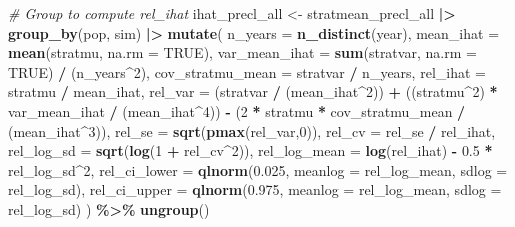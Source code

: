 \documentclass[
]{article}
\newenvironment{Shaded}{\begin{snugshade}}{\end{snugshade}}
\newcommand{\AttributeTok}[1]{\textcolor[rgb]{0.13,0.29,0.53}{#1}}
\newcommand{\CommentTok}[1]{\textcolor[rgb]{0.56,0.35,0.01}{\textit{#1}}}
\newcommand{\ConstantTok}[1]{\textcolor[rgb]{0.56,0.35,0.01}{#1}}
\newcommand{\DecValTok}[1]{\textcolor[rgb]{0.00,0.00,0.81}{#1}}
\newcommand{\FloatTok}[1]{\textcolor[rgb]{0.00,0.00,0.81}{#1}}
\newcommand{\FunctionTok}[1]{\textcolor[rgb]{0.13,0.29,0.53}{\textbf{#1}}}
\newcommand{\NormalTok}[1]{#1}
\newcommand{\OtherTok}[1]{\textcolor[rgb]{0.56,0.35,0.01}{#1}}
\newcommand{\SpecialCharTok}[1]{\textcolor[rgb]{0.81,0.36,0.00}{\textbf{#1}}}
\begin{document}
\begin{Shaded}
\begin{Highlighting}[]
\CommentTok{\# Group to compute rel\_ihat }
\NormalTok{ihat\_precl\_all }\OtherTok{\textless{}{-}}\NormalTok{ stratmean\_precl\_all }\SpecialCharTok{|\textgreater{}}
  \FunctionTok{group\_by}\NormalTok{(pop, sim) }\SpecialCharTok{|\textgreater{}}
  \FunctionTok{mutate}\NormalTok{(}
    \AttributeTok{n\_years =} \FunctionTok{n\_distinct}\NormalTok{(year), }
    \AttributeTok{mean\_ihat =} \FunctionTok{mean}\NormalTok{(stratmu, }\AttributeTok{na.rm =} \ConstantTok{TRUE}\NormalTok{), }
    \AttributeTok{var\_mean\_ihat =} \FunctionTok{sum}\NormalTok{(stratvar, }\AttributeTok{na.rm =} \ConstantTok{TRUE}\NormalTok{) }\SpecialCharTok{/}\NormalTok{ (n\_years}\SpecialCharTok{\^{}}\DecValTok{2}\NormalTok{),}
    \AttributeTok{cov\_stratmu\_mean =}\NormalTok{ stratvar }\SpecialCharTok{/}\NormalTok{ n\_years,}
    \AttributeTok{rel\_ihat =}\NormalTok{ stratmu }\SpecialCharTok{/}\NormalTok{ mean\_ihat,}
    \AttributeTok{rel\_var =}
\NormalTok{      (stratvar }\SpecialCharTok{/}\NormalTok{ (mean\_ihat}\SpecialCharTok{\^{}}\DecValTok{2}\NormalTok{)) }\SpecialCharTok{+}
\NormalTok{      ((stratmu}\SpecialCharTok{\^{}}\DecValTok{2}\NormalTok{) }\SpecialCharTok{*}\NormalTok{ var\_mean\_ihat }\SpecialCharTok{/}\NormalTok{ (mean\_ihat}\SpecialCharTok{\^{}}\DecValTok{4}\NormalTok{)) }\SpecialCharTok{{-}}
\NormalTok{      (}\DecValTok{2} \SpecialCharTok{*}\NormalTok{ stratmu }\SpecialCharTok{*}\NormalTok{ cov\_stratmu\_mean }\SpecialCharTok{/}\NormalTok{ (mean\_ihat}\SpecialCharTok{\^{}}\DecValTok{3}\NormalTok{)),}
    \AttributeTok{rel\_se =} \FunctionTok{sqrt}\NormalTok{(}\FunctionTok{pmax}\NormalTok{(rel\_var,}\DecValTok{0}\NormalTok{)), }
    \AttributeTok{rel\_cv =}\NormalTok{ rel\_se }\SpecialCharTok{/}\NormalTok{ rel\_ihat, }
    \AttributeTok{rel\_log\_sd =} \FunctionTok{sqrt}\NormalTok{(}\FunctionTok{log}\NormalTok{(}\DecValTok{1} \SpecialCharTok{+}\NormalTok{ rel\_cv}\SpecialCharTok{\^{}}\DecValTok{2}\NormalTok{)), }
    \AttributeTok{rel\_log\_mean =} \FunctionTok{log}\NormalTok{(rel\_ihat) }\SpecialCharTok{{-}} \FloatTok{0.5} \SpecialCharTok{*}\NormalTok{ rel\_log\_sd}\SpecialCharTok{\^{}}\DecValTok{2}\NormalTok{, }
    \AttributeTok{rel\_ci\_lower =} \FunctionTok{qlnorm}\NormalTok{(}\FloatTok{0.025}\NormalTok{, }\AttributeTok{meanlog =}\NormalTok{ rel\_log\_mean, }\AttributeTok{sdlog =}\NormalTok{ rel\_log\_sd),}
    \AttributeTok{rel\_ci\_upper =} \FunctionTok{qlnorm}\NormalTok{(}\FloatTok{0.975}\NormalTok{, }\AttributeTok{meanlog =}\NormalTok{ rel\_log\_mean, }\AttributeTok{sdlog =}\NormalTok{ rel\_log\_sd)}
\NormalTok{  ) }\SpecialCharTok{\%\textgreater{}\%}
    \FunctionTok{ungroup}\NormalTok{()}



\end{Highlighting}
\end{Shaded}
\end{document}
